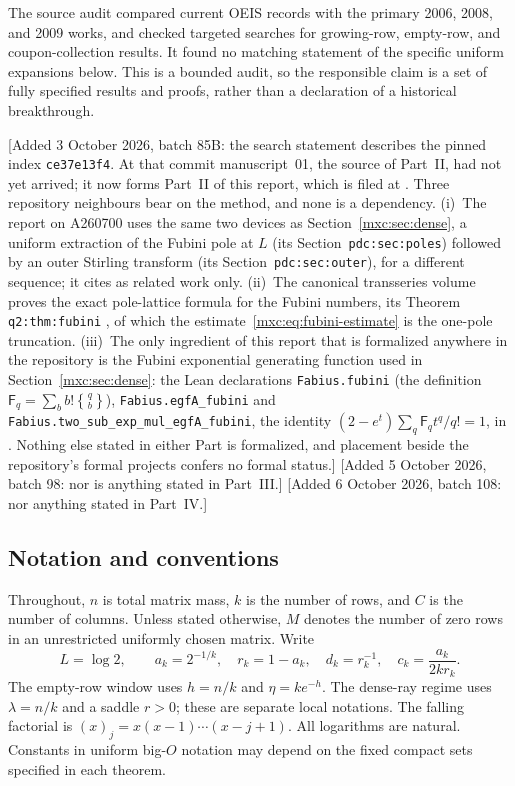 \documentclass[11pt]{article}
\numberwithin{equation}{section}
\theoremstyle{definition}
\theoremstyle{remark}
\newcommand{\StirTwo}[2]{\genfrac{\{} {\}}{0pt}{}{#1}{#2}}
\begin{document}
The source audit compared current OEIS records with the primary 2006,
2008, and 2009 works, and checked targeted searches for growing-row,
empty-row, and coupon-collection results. It found no matching statement
of the specific uniform expansions below. This is a bounded audit, so
the responsible claim is a set of fully specified results and proofs,
rather than a declaration of a historical breakthrough.

[Added 3 October 2026, batch 85B: the search statement describes the
pinned index \texttt{ce37e13f4}. At that commit manuscript~01, the source of
Part~II, had not yet arrived; it now forms Part~II of this report, which is
filed at
.
Three repository neighbours bear on the method, and none is a dependency.
(i)~The report on A260700 \cite{pdc} uses the same two devices as
Section~\ref{mxc:sec:dense}, a uniform extraction of the Fubini pole at
$L$ (its Section~\texttt{pdc:sec:poles}) followed by an outer Stirling
transform (its Section~\texttt{pdc:sec:outer}), for a different sequence;
it cites \cite{mpr2009} as related work only. (ii)~The canonical
transseries volume proves the exact pole-lattice formula for the Fubini
numbers, its Theorem \texttt{q2:thm:fubini} \cite{tsvol}, of which the
estimate~\eqref{mxc:eq:fubini-estimate} is the one-pole truncation. (iii)~The
only ingredient of this report that is formalized anywhere in the
repository is the Fubini exponential generating function used in
Section~\ref{mxc:sec:dense}: the Lean declarations \texttt{Fabius.fubini}
(the definition $\mathsf F_q=\sum_bb!\StirTwo qb$),
\texttt{Fabius.egfA\_fubini} and
\texttt{Fabius.two\_sub\_exp\_mul\_egfA\_fubini}, the identity
$(2-e^t)\sum_q\mathsf F_qt^q/q!=1$, in
\cite{leanob}. Nothing else stated in either Part is formalized, and
placement beside the repository's formal projects confers no formal
status.] [Added 5 October 2026, batch 98: nor is anything stated in
Part~III.] [Added 6 October 2026, batch 108: nor anything stated in
Part~IV.]

\subsection{Notation and conventions}
Throughout, $n$ is total matrix mass, $k$ is the number of rows, and $C$ is
the number of columns. Unless stated otherwise, $M$ denotes the number of
zero rows in an unrestricted uniformly chosen matrix. Write
\[
 L=\log 2,\qquad
 a_k=2^{-1/k},\quad r_k=1-a_k,\quad
 d_k=r_k^{-1},\quad c_k=\frac{a_k}{2kr_k}.
\]
The empty-row window uses $h=n/k$ and $\eta=k e^{-h}$. The dense-ray
regime uses $\lambda=n/k$ and a saddle $r>0$; these are separate local
notations. The falling factorial is $(x)_j=x(x-1)\cdots(x-j+1)$.
All logarithms are natural. Constants in uniform big-$O$ notation may
depend on the fixed compact sets specified in each theorem.
\end{document}
